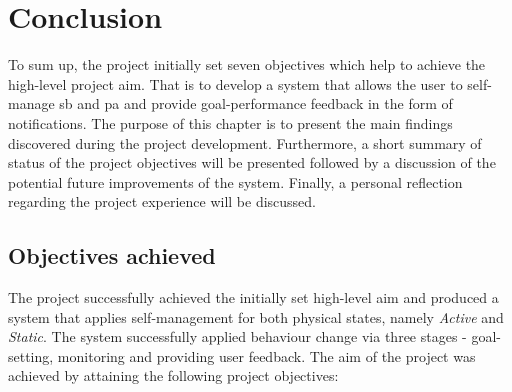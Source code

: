 \chapter{Conclusion}
To sum up, the project initially set seven objectives which help to achieve the high-level project aim. That is to develop a system that allows the user to self-manage \gls{sb} and \gls{pa} and provide goal-performance feedback in the form of notifications. The purpose of this chapter is to present the main findings discovered during the project development. Furthermore, a short summary of status of the project objectives will be presented followed by a discussion of the potential future improvements of the system. Finally, a personal reflection regarding the project experience will be discussed. 

\section{Objectives achieved}
The project successfully achieved the initially set high-level aim and produced a system that applies self-management for both physical states, namely \textit{Active} and \textit{Static}. The system successfully applied behaviour change via three stages - goal-setting, monitoring and providing user feedback. The aim of the project was achieved by attaining the following project objectives:

